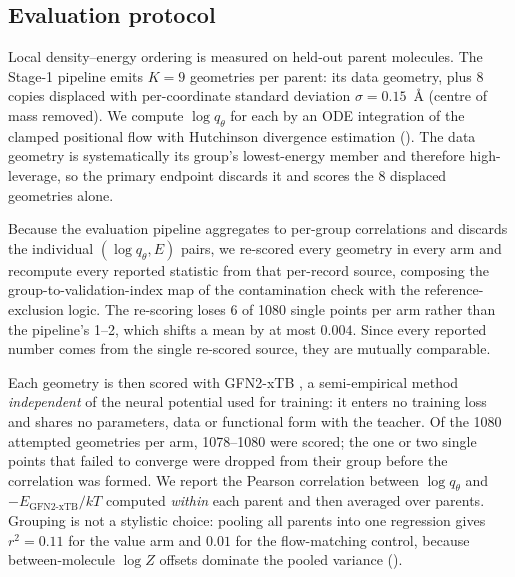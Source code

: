 \subsection{Evaluation protocol}
\label{app:eval}

Local density--energy ordering is measured on held-out parent molecules. The
Stage-1 pipeline emits $K = 9$ geometries per parent: its data geometry, plus 8
copies displaced with per-coordinate standard deviation $\sigma = 0.15$~\AA{}
(centre of mass removed). We compute $\log q_\theta$ for each by an ODE
integration of the clamped positional flow with Hutchinson divergence estimation
(). The data geometry
is systematically its group's lowest-energy member and therefore high-leverage, so
the primary endpoint discards it and scores the 8 displaced geometries alone.

Because the evaluation pipeline aggregates to per-group correlations and discards
the individual $(\log q_\theta, E)$ pairs, we re-scored every geometry in every
arm and recompute every reported statistic from that per-record source, composing
the group-to-validation-index map of the contamination check with the
reference-exclusion logic. The re-scoring loses 6 of 1080 single points per arm
rather than the pipeline's 1--2, which shifts a mean by at most $0.004$. Since
every reported number comes from the single re-scored source, they are mutually
comparable.

Each geometry is then scored with GFN2-xTB \citep{gfn2xtb}, a semi-empirical method
\emph{independent} of the neural potential used for training: it enters no training
loss and shares no parameters, data or functional form with the teacher. Of the
1080 attempted geometries per arm, 1078--1080 were scored; the one or two single
points that failed to converge were dropped from their group before the correlation
was formed. We report the Pearson correlation between $\log q_\theta$ and
$-E_{\text{GFN2-xTB}}/kT$ computed \emph{within} each parent and then averaged over
parents. Grouping is not a stylistic choice: pooling all parents into one
regression gives $r^2 = 0.11$ for the value arm and $0.01$ for the flow-matching
control, because between-molecule $\log Z$ offsets dominate the pooled variance
().

